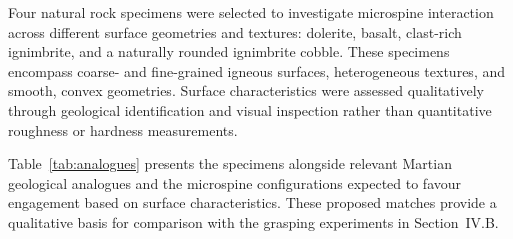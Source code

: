 \documentclass[letterpaper, 10 pt, conference, twoside]{ieeetran}
\begin{document}
Four natural rock specimens were selected to investigate microspine interaction across different surface geometries and textures: dolerite, basalt, clast-rich ignimbrite, and a naturally rounded ignimbrite cobble. These specimens encompass coarse- and fine-grained igneous surfaces, heterogeneous textures, and smooth, convex geometries. Surface characteristics were assessed qualitatively through geological identification and visual inspection rather than quantitative roughness or hardness measurements.

Table~\ref{tab:analogues} presents the specimens alongside relevant Martian geological analogues and the microspine configurations expected to favour engagement based on surface characteristics. These proposed matches provide a qualitative basis for comparison with the grasping experiments in Section~IV.B.
\end{document}
